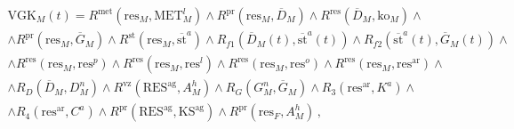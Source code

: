   \begin{multline}


  \mathrm{VGK}_M(t) =R^{\mathrm{met}}\left( \mathrm{res}_M ,\mathrm{MET}_M^l\right) \wedge 


R^{\mathrm{pr}} \left( \mathrm{res}_M, \overline{D}_M\right) \wedge R^{\mathrm{res}} \left( 


\overline{D}_M, \mathrm{ko}_M\right) \wedge\\


\wedge  R^{\mathrm{pr}}\left(\mathrm{res}_M, 


\overline{G}_M\right)\wedge


 R^{\mathrm{st}} \left( \mathrm{res}_M, \overline{\mathrm{st}}^a\right)\wedge 


R_{f1}\left( \overline{D}_M(t), \overline{\mathrm{st}}^a(t)\right) \wedge 


R_{f2} \left( 


\overline{\mathrm{st}}^a(t), \overline{G}_M(t)\right)\wedge\\


\wedge R^{\mathrm{res}} \left( 


\mathrm{res}_M, \mathrm{res}^p\right)


  \wedge R^{\mathrm{res}}\left( \mathrm{res}_M, \mathrm{res}^l\right) \wedge 


R^{\mathrm{res}}\left( \mathrm{res}_M, \mathrm{res}^o\right) \wedge R^{\mathrm{res}}\left( 


\mathrm{res}_M, \mathrm{res}^{\mathrm{ar}}\right)\wedge\\


\wedge R_D \left( \overline{D}_M, D_M^n\right) 


\wedge R^{\mathrm{vz}}\left( \mathrm{RES}^{\mathrm{ag}}, A^h_M\right)


  \wedge


  R_G\left( G_M^n, \overline{G}_M\right) 


  \wedge R_3 \left( \mathrm{res}^{\mathrm{ar}}, 


K^a\right)\wedge\\


\wedge R_4\left( \mathrm{res}^{\mathrm{ar}}, C^a\right)\wedge R^{\mathrm{pr}}\left( 


\mathrm{RES}^{\mathrm{ag}}, \mathrm{KS}^{\mathrm{ag}}\right) \wedge R^{\mathrm{pr}} \left( 


\mathrm{res}_F, A_M^h\right)\,,


  \end{multline}


